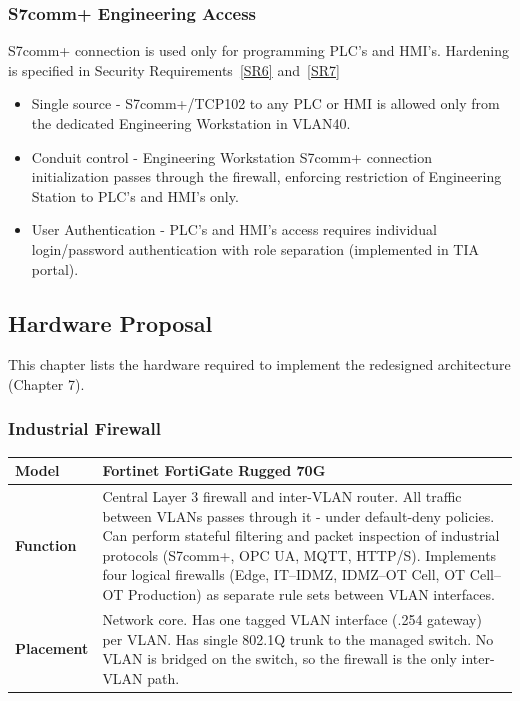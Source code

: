 \documentclass[11pt,a4paper]{article}
\renewcommand{\arraystretch}{1.15}
\begin{document}
\subsubsection{S7comm+ Engineering Access}
S7comm+ connection is used only for programming PLC's and HMI's. Hardening is
specified in Security Requirements~\ref{SR6} and~\ref{SR7}

\begin{itemize}

    \item Single source - S7comm+/TCP102 to any PLC or HMI is allowed only from
        the dedicated Engineering Workstation in VLAN40.

    \item Conduit control - Engineering Workstation S7comm+ connection
        initialization passes through the firewall, enforcing restriction of
        Engineering Station to PLC's and HMI's only.

    \item User Authentication - PLC's and HMI's access requires individual
        login/password authentication with role separation (implemented in TIA
        portal).

\end{itemize}

\subsection{Hardware Proposal}
This chapter lists the hardware required to implement the redesigned
architecture (Chapter 7). 

\subsubsection{Industrial Firewall}
\renewcommand{\arraystretch}{1.3} %
\begin{tabularx}{\textwidth}{>{\bfseries}p{2.5cm} X}
    \toprule
    Model & Fortinet FortiGate Rugged 70G \\
    \midrule
    Function & Central Layer 3 firewall and inter-VLAN router. All traffic
    between VLANs passes through it - under default-deny policies. Can perform
    stateful filtering and packet inspection of industrial protocols (S7comm+,
    OPC UA, MQTT, HTTP/S). Implements four logical firewalls (Edge, IT–IDMZ,
    IDMZ–OT Cell, OT Cell–OT Production) as separate rule sets between VLAN
    interfaces. \\
    \midrule
    Placement & Network core. Has one tagged VLAN interface (.254 gateway) per
    VLAN. Has single 802.1Q trunk to the managed switch. No VLAN is bridged on
    the switch, so the firewall is the only inter-VLAN path. \\
    \midrule
\end{tabularx}
\end{document}
